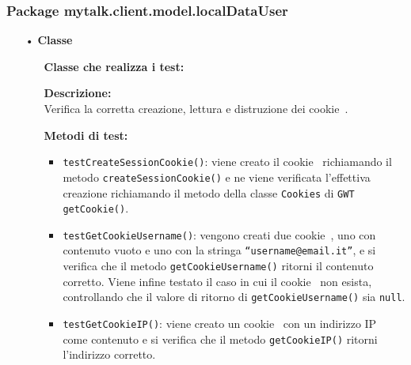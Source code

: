 {\begin{sloppypar}
{		\subsubsection{Package mytalk.client.model.localDataUser}{
			
			\begin{itemize}
				\item[•]\textbf{Classe } 
				\begin{itemize}
					\item[] \textbf{Classe che realizza i test:} \\ 

					\item[] \textbf{Descrizione:} \\ Verifica la corretta creazione, lettura e distruzione dei cookie\g~.

					\item[] \textbf{Metodi di test:}
					\begin{itemize}
						\item \texttt{testCreateSessionCookie()}: viene creato il cookie\g~ richiamando il metodo \texttt{createSessionCookie()} e ne viene verificata l’effettiva creazione richiamando il metodo della classe \texttt{Cookies} di \texttt{GWT} \texttt{getCookie()}.
						
						\item \texttt{testGetCookieUsername()}: vengono creati due cookie\g~, uno con contenuto vuoto e uno con la stringa \texttt{“username@email.it”}, e si verifica che il metodo \texttt{getCookieUsername()} ritorni il contenuto corretto. Viene infine testato il caso in cui il cookie\g~ non esista, controllando che il valore di ritorno di \texttt{getCookieUsername()} sia \texttt{null}.


						\item \texttt{testGetCookieIP()}: viene creato un cookie\g~ con un indirizzo IP\g~ come contenuto e si verifica che il metodo \texttt{getCookieIP()} ritorni l'indirizzo corretto.


\end{itemize}
\end{itemize}
\end{itemize}}}
\end{sloppypar}}
